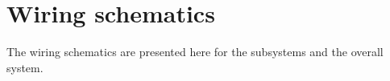 
%
\chapter{Wiring schematics}%
\label{ch:append-wiring}
The wiring schematics are presented here for the subsystems and the overall system.


